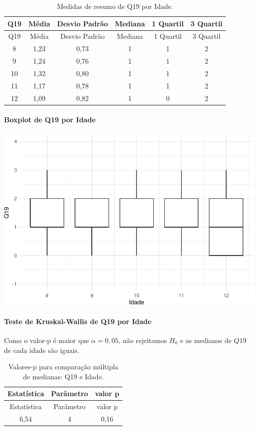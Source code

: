 \documentclass[]{article}
\let\oldparagraph\paragraph
\renewcommand{\paragraph}[1]{\oldparagraph{#1}\mbox{}}
\begin{document}
\begin{longtable}[]{@{}cccccc@{}}
\caption{\label{tab:unnamed-chunk-267}Medidas de resumo de Q19 por Idade.}\tabularnewline
\toprule
Q19 & Média & Desvio Padrão & Mediana & 1 Quartil & 3 Quartil\tabularnewline
\midrule
\endfirsthead
\toprule
Q19 & Média & Desvio Padrão & Mediana & 1 Quartil & 3 Quartil\tabularnewline
\midrule
\endhead
8 & 1,23 & 0,73 & 1 & 1 & 2\tabularnewline
9 & 1,24 & 0,76 & 1 & 1 & 2\tabularnewline
10 & 1,32 & 0,80 & 1 & 1 & 2\tabularnewline
11 & 1,17 & 0,78 & 1 & 1 & 2\tabularnewline
12 & 1,09 & 0,82 & 1 & 0 & 2\tabularnewline
\bottomrule
\end{longtable}

\hypertarget{boxplot-de-q19-por-idade}{%
\paragraph{Boxplot de Q19 por Idade}\label{boxplot-de-q19-por-idade}}

\begin{center}\includegraphics[width=0.75\linewidth]{relatorio_files/figure-latex/unnamed-chunk-268-1} \end{center}

\hypertarget{teste-de-kruskal-wallis-de-q19-por-idade}{%
\paragraph{Teste de Kruskal-Wallis de Q19 por Idade}\label{teste-de-kruskal-wallis-de-q19-por-idade}}

Como o valor-p é maior que \(\alpha=0,05\), não rejeitamos \(H_0\) e as medianas de \(Q19\) de cada idade são iguais.

\begin{longtable}[]{@{}ccc@{}}
\caption{\label{tab:unnamed-chunk-269}Valores-p para comparação múltipla de medianas: Q19 e Idade.}\tabularnewline
\toprule
Estatística & Parâmetro & valor p\tabularnewline
\midrule
\endfirsthead
\toprule
Estatística & Parâmetro & valor p\tabularnewline
\midrule
\endhead
6,54 & 4 & 0,16\tabularnewline
\bottomrule
\end{longtable}
\end{document}
